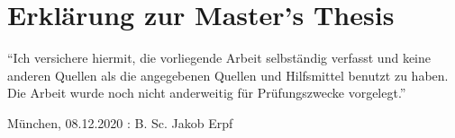 \cleardoubleoddpage	
\chapter*{Erklärung zur Master’s Thesis}
\thispagestyle{empty} %

\enquote{Ich versichere hiermit, die vorliegende Arbeit selbständig verfasst und keine anderen Quellen als die angegebenen Quellen und Hilfsmittel benutzt zu haben. Die Arbeit wurde noch nicht anderweitig für Prüfungszwecke vorgelegt.}

\vspace{4cm}

München, 08.12.2020 : \hrulefill \newline
\hspace*{0mm}\phantom{München, 08.12.2020: } B. Sc. Jakob Erpf